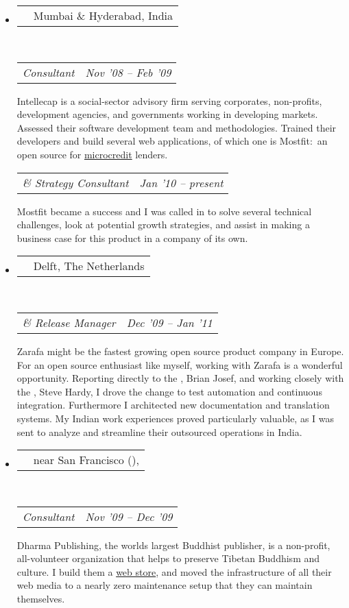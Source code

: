 \documentclass[10pt,a4paper]{article}
\makeatletter
\newcommand{\headerrow}[2]
{\begin{tabular*}{\linewidth}{l@{\extracolsep{\fill}}r}
	\textscale{1.08}{\textbf{#1}} &
	{\sc #2} \\
\end{tabular*}}
\newcommand{\subheaderrow}[2]
{\begin{tabular*}{\linewidth}{l@{\extracolsep{\fill}}r}
	\emph{#1} &
	\emph{#2} \\
\end{tabular*}}
\makeatother
\begin{document}
\begin{itemize}
	\parskip=0.1em

	\item
	\headerrow
		{\href{http://www.intellecap.com}{Intellecap}}
		{Mumbai \& Hyderabad, India}
	\\
  \subheaderrow
		{\textscale{.85}{IT} Consultant}
		{Nov '08 -- Feb '09}
  {Intellecap is a social-sector advisory firm serving corporates, non-profits, development agencies, and governments working in developing markets. Assessed their software development team and methodologies. Trained their developers and build several web applications, of which one is Mostfit:\ an open source  for \href{http://en.wikipedia.org/wiki/Microcredit}{microcredit} lenders.
  \vspace{0.2em}}
  \\
	\subheaderrow
		{\textscale{.85}{IT} \& Strategy Consultant}
		{Jan '10 -- present}
  Mostfit became a success and I was called in to solve several technical challenges, look at potential growth strategies, and assist in making a business case for this product in a company of its own.

	\item
	\headerrow
		{\href{http://www.zarafa.com}{Zarafa}}
		{Delft, The Netherlands}
	\\
	\subheaderrow
		{\textscale{.85}{QA} \& Release Manager}
		{Dec '09 -- Jan '11}
  Zarafa might be the fastest growing open source product company in Europe. For an open source enthusiast like myself, working with Zarafa is a wonderful opportunity. Reporting directly to the , Brian Josef, and working closely with the , Steve Hardy, I drove the change to test automation and continuous integration. Furthermore I architected new documentation and translation systems. My Indian work experiences proved particularly valuable, as I was sent to analyze and streamline their outsourced operations in India.

	\item
	\headerrow
		{\href{http://www.dharmapublishing.com}{Dharma Publishing}}
		{near San Francisco (\textscale{.85}{CA}), \textscale{.85}{USA}}
	\\
	\subheaderrow
		{\textscale{.85}{IT} Consultant}
		{Nov '09 -- Dec '09}
  Dharma Publishing, the worlds largest Buddhist publisher, is a non-profit, all-volunteer organization that helps to preserve Tibetan Buddhism and culture. I build them a \href{http://www.dharmapublishing.com}{web store}, and moved the infrastructure of all their web media to a nearly zero maintenance setup that they can maintain themselves.


\end{itemize}
\end{document}
